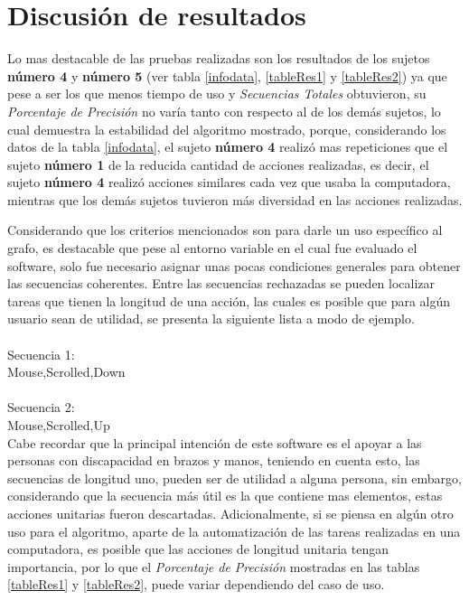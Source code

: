 \section{Discusi\'{o}n de resultados}


Lo mas destacable de las pruebas realizadas son los resultados de los sujetos 
 \textbf{n\'umero 4} y \textbf{n\'umero 5}
 (ver tabla \ref{infodata}, \ref{tableRes1} y 
 \ref{tableRes2}) ya que pese a ser los que menos tiempo de uso y
 \emph{Secuencias Totales} obtuvieron, su \emph{Porcentaje de Precisi\'on}
 no var\'ia tanto con respecto al de los dem\'as sujetos, lo cual demuestra 
 la estabilidad del algoritmo mostrado, porque, considerando los datos de la 
 tabla \ref{infodata}, el sujeto \textbf{n\'umero 4} realiz\'o mas 
 repeticiones que el sujeto \textbf{n\'umero 1} de la reducida cantidad de 
 acciones realizadas, es decir, el sujeto \textbf{n\'umero 4} realiz\'o 
 acciones similares cada vez que usaba la computadora, mientras que los 
 dem\'as sujetos tuvieron m\'as diversidad en las acciones realizadas.
 
 
Considerando que los criterios mencionados son para darle un uso espec\'ifico
 al grafo, es destacable que pese al entorno variable en el cual fue evaluado
 el software, solo fue necesario asignar unas pocas
 condiciones generales para obtener las secuencias coherentes. 
 Entre las secuencias rechazadas se pueden localizar tareas que tienen la
 longitud de una acci\'on, las cuales es posible que para alg\'un usuario 
 sean de utilidad, se presenta la siguiente lista a modo de ejemplo.
\\
\\
Secuencia 1:\\
Mouse,Scrolled,Down\\
\\
Secuencia 2:\\
Mouse,Scrolled,Up\\

Cabe recordar que la principal intenci\'on de este software es el apoyar a 
 las personas con discapacidad en brazos y manos, teniendo en cuenta esto, 
 las secuencias de longitud uno, pueden ser de utilidad a alguna persona, sin 
 embargo, considerando que la secuencia m\'as \'util es la que contiene mas 
 elementos, estas acciones unitarias fueron descartadas. Adicionalmente, si 
 se piensa en alg\'un otro uso para el algoritmo, aparte de la 
 automatizaci\'on de las tareas realizadas en una computadora, es posible que 
 las acciones de longitud unitaria tengan importancia, por lo que el
 \emph{Porcentaje de Precisi\'on} mostradas en las tablas \ref{tableRes1} y
 \ref{tableRes2}, puede variar dependiendo del caso de uso.

